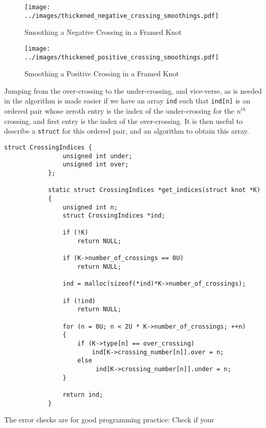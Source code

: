 \documentclass{article}
\theoremstyle{plain}
\begin{document}
        \begin{figure}
            \centering
            \texttt{[image: ../images/thickened\_negative\_crossing\_smoothings.pdf]}
            \caption{Smoothing a Negative Crossing in a Framed Knot}
            \label{fig:thickened_negative_crossing_smoothings}
        \end{figure}
        \begin{figure}
            \centering
            \texttt{[image: ../images/thickened\_positive\_crossing\_smoothings.pdf]}
            \caption{Smoothing a Positive Crossing in a Framed Knot}
            \label{fig:thickened_positive_crossing_smoothings}
        \end{figure}
        Jumping from the over-crossing to the under-crossing, and vice-verse,
        as is needed in the algorithm is made easier if we have an array
        \texttt{ind} such that \texttt{ind[n]} is an ordered pair whose
        zeroth entry is the index of the under-crossing for the $n^{th}$
        crossing, and first entry is the index of the over-crossing. It is then
        useful to describe a \texttt{struct} for this ordered pair, and an
        algorithm to obtain this array.
        \begin{lstlisting}[style=CStyle, gobble=12]
            struct CrossingIndices {
                unsigned int under;
                unsigned int over;
            };

            static struct CrossingIndices *get_indices(struct knot *K)
            {
                unsigned int n;
                struct CrossingIndices *ind;

                if (!K)
                    return NULL;

                if (K->number_of_crossings == 0U)
                    return NULL;

                ind = malloc(sizeof(*ind)*K->number_of_crossings);

                if (!ind)
                    return NULL;

                for (n = 0U; n < 2U * K->number_of_crossings; ++n)
                {
                    if (K->type[n] == over_crossing)
                        ind[K->crossing_number[n]].over = n;
                    else
                         ind[K->crossing_number[n]].under = n;
                }

                return ind;
            }
        \end{lstlisting}
        The error checks are for good programming practice: Check if your
\end{document}
